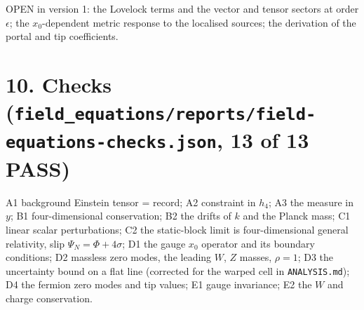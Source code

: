 \documentclass[11pt]{article}
\begin{document}
OPEN in version 1: the Lovelock terms and the vector and tensor sectors at order $\epsilon$; the $x_0$-dependent metric response to the localised sources; the derivation of the portal and tip coefficients.

\section*{10. Checks (\texttt{field\_\allowbreak{}equations/\allowbreak{}reports/\allowbreak{}field-{}\allowbreak{}equations-{}\allowbreak{}checks.\allowbreak{}json}, 13 of 13 PASS)}

A1 background Einstein tensor = record; A2 constraint in $h_4$; A3 the measure in $y$; B1 four-dimensional conservation; B2 the drifts of $k$ and the Planck mass; C1 linear scalar perturbations; C2 the static-block limit is four-dimensional general relativity, slip $\Psi_N = \Phi + 4\sigma$; D1 the gauge $x_0$ operator and its boundary conditions; D2 massless zero modes, the leading $W$, $Z$ masses, $\rho = 1$; D3 the uncertainty bound on a flat line (corrected for the warped cell in \texttt{ANALYSIS.\allowbreak{}md}); D4 the fermion zero modes and tip values; E1 gauge invariance; E2 the $W$ and charge conservation.
\end{document}
